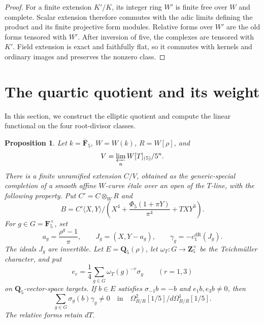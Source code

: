 \documentclass[11pt,a4paper]{amsart}
\numberwithin{equation}{section}
\newtheorem{proposition}[theorem]{Proposition}
\theoremstyle{definition}
\theoremstyle{remark}
\newcommand{\DtwoZZ}{\mathbf{Z}}
\newcommand{\DtwoQQ}{\mathbf{Q}}
\newcommand{\DtwoFF}{\mathbf{F}}
\newcommand{\DtwodR}{\mathrm{dR}}
\begin{document}
\begin{proof}
For a finite extension \(K'/K\), its integer ring \(W'\) is finite
free over \(W\) and complete.
Scalar extension therefore commutes with the adic limits defining
the product and its finite projective form modules.
Relative forms over \(W'\) are the old forms tensored with \(W'\).
After inversion of five, the complexes are tensored with \(K'\).
Field extension is exact and faithfully flat, so it commutes with
kernels and ordinary images and preserves the nonzero class.
\end{proof}

\section{The quartic quotient and its weight}\label{d2:sec:quartic}

In this section, we construct the elliptic quotient and compute the
linear functional on the four root-divisor classes.

\begin{proposition}\label{d2:prop:weighted}
Let \(k=\overline{\DtwoFF}_5\), \(W=W(k)\), \(R=W[\rho]\), and
\[
 V=\varprojlim_n W[T]_{(5)}/5^n.
\]
There is a finite unramified extension \(C/V\), obtained as the
generic-special completion of a smooth affine \(W\)-curve \'etale
over an open of the \(T\)-line, with the following property.
Put \(C'=C\otimes_WR\) and
\[
 B=C'\langle X,Y\rangle/
 \left(X^4+\frac{\Phi_5(1+\pi Y)}{\pi^4}+TXY^3\right).
\]
For \(g\in G=\DtwoFF_5^\times\), set
\[
 a_g=\frac{\rho^g-1}{\pi},\qquad
 J_g=(X,Y-a_g),\qquad
 \gamma_g=-c_1^\DtwodR(J_g).
\]
The ideals \(J_g\) are invertible.
Let \(E=\DtwoQQ_5(\rho)\), let
\(\omega_T\colon G\to\DtwoZZ_5^\times\) be the Teichm\"uller character,
and put
\[
 e_r=\frac14\sum_{g\in G}\omega_T(g)^{-r}\sigma_g
 \qquad(r=1,3)
\]
on \(\DtwoQQ_5\)-vector-space targets.
If \(b\in E\) satisfies
\(\sigma_{-1}b=-b\) and \(e_1b,e_3b\ne0\), then
\[
 \sum_{g\in G}\sigma_g(b)\gamma_g\ne0
 \quad\text{in}\quad
 \Omega^2_{B/R}[1/5]\big/d\Omega^1_{B/R}[1/5].
\]
The relative forms retain \(dT\).
\end{proposition}
\end{document}
